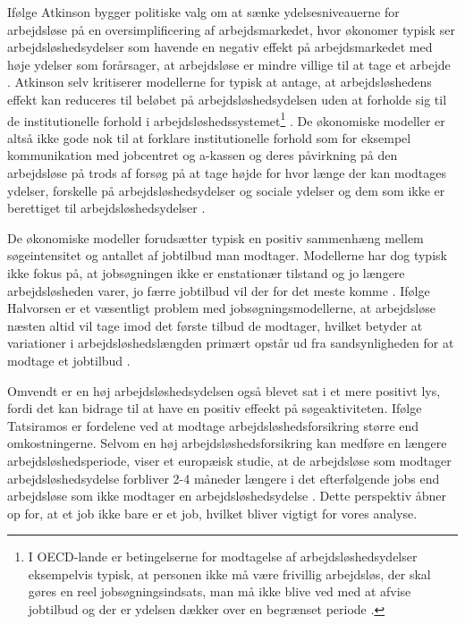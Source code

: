 Ifølge Atkinson bygger politiske valg om at sænke ydelsesniveauerne for arbejdsløse på en oversimplificering af arbejdsmarkedet, hvor økonomer typisk ser arbejdsløshedsydelser som havende en negativ effekt på arbejdsmarkedet med høje ydelser som forårsager, at arbejdsløse er mindre villige til at tage et arbejde \parencite[1680]{Atkinson1991}. Atkinson selv kritiserer modellerne for typisk at antage, at arbejdsløshedens effekt kan reduceres til beløbet på arbejdsløshedsydelsen uden at forholde sig til de institutionelle forhold i arbejdsløshedssystemet\footnote{I OECD-lande er betingelserne for modtagelse af arbejdsløshedsydelser eksempelvis typisk, at personen ikke må være frivillig arbejdsløs, der skal gøres en reel jobsøgningsindsats, man må ikke blive ved med at afvise jobtilbud og der er ydelsen dækker over en begrænset periode \parencite[1689]{Atkinson1991}.} \parencite[1688]{Atkinson1991}. De økonomiske modeller er altså ikke gode nok til at forklare institutionelle forhold som for eksempel kommunikation med jobcentret og a-kassen og deres påvirkning på den arbejdsløse på trods af forsøg på at tage højde for hvor længe der kan modtages ydelser, forskelle på arbejdsløshedsydelser og sociale ydelser og dem som ikke er berettiget til arbejdsløshedsydelser \parencite[1692]{Atkinson1991} \parencite[33-34]{Halvorsen1999} \parencite[114]{Cahuc2004}.

De økonomiske modeller forudsætter typisk en positiv sammenhæng mellem søgeintensitet og antallet af jobtilbud man modtager. Modellerne har dog typisk ikke fokus på, at jobsøgningen ikke er enstationær tilstand og jo længere arbejdsløsheden varer, jo færre jobtilbud vil der for det meste komme \parencite[119]{Cahuc2004}. %
Ifølge Halvorsen er et væsentligt problem med jobsøgningsmodellerne, at arbejdsløse næsten altid vil tage imod det første tilbud de modtager, hvilket betyder at variationer i arbejdsløshedslængden primært opstår ud fra sandsynligheden for at modtage et jobtilbud \parencite[28]{Halvorsen1999}.

Omvendt er en høj arbejdsløshedsydelsen også blevet sat i et mere positivt lys, fordi det kan bidrage til at have en positiv effeekt på søgeaktiviteten. Ifølge Tatsiramos er fordelene ved at modtage arbejdsløshedsforsikring større end omkostningerne. Selvom en høj arbejdsløshedsforsikring kan medføre en længere arbejdsløshedsperiode, viser et europæisk studie, at de arbejdsløse som modtager arbejdsløshedsydelse forbliver 2-4 måneder længere i det efterfølgende jobs end arbejdsløse som ikke modtager en arbejdsløshedsydelse \parencite[602]{Mankiw2011}. Dette perspektiv åbner op for, at et job ikke bare er et job, hvilket bliver vigtigt for vores analyse. %

